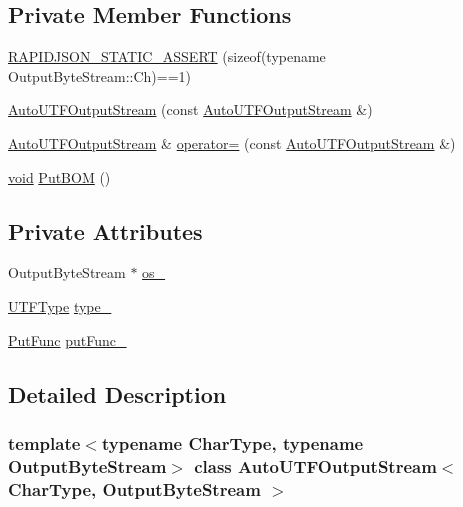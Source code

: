 \subsection*{Private Member Functions}
\begin{DoxyCompactItemize}
\item 
\hyperlink{classAutoUTFOutputStream_a6fbc88c345f0b7beef9053e8a0315fb4}{R\+A\+P\+I\+D\+J\+S\+O\+N\+\_\+\+S\+T\+A\+T\+I\+C\+\_\+\+A\+S\+S\+E\+RT} (sizeof(typename Output\+Byte\+Stream\+::\+Ch)==1)
\item 
\hyperlink{classAutoUTFOutputStream_aceb5330e6fddef6a439a105fe501f1d4}{Auto\+U\+T\+F\+Output\+Stream} (const \hyperlink{classAutoUTFOutputStream}{Auto\+U\+T\+F\+Output\+Stream} \&)
\item 
\hyperlink{classAutoUTFOutputStream}{Auto\+U\+T\+F\+Output\+Stream} \& \hyperlink{classAutoUTFOutputStream_a498613c6dcada9980fea3d6094f21215}{operator=} (const \hyperlink{classAutoUTFOutputStream}{Auto\+U\+T\+F\+Output\+Stream} \&)
\item 
\hyperlink{imgui__impl__opengl3__loader_8h_ac668e7cffd9e2e9cfee428b9b2f34fa7}{void} \hyperlink{classAutoUTFOutputStream_abcfbaa81ceaddf06ae435ba3e78421d7}{Put\+B\+OM} ()
\end{DoxyCompactItemize}
\subsection*{Private Attributes}
\begin{DoxyCompactItemize}
\item 
Output\+Byte\+Stream $\ast$ \hyperlink{classAutoUTFOutputStream_a723efb60d9fdb46e6094db891d24a509}{os\+\_\+}
\item 
\hyperlink{encodings_8h_ac9448aedf514a5bb509bae73a9ce4e58}{U\+T\+F\+Type} \hyperlink{classAutoUTFOutputStream_a767a11d3801e410881972013376d69eb}{type\+\_\+}
\item 
\hyperlink{classAutoUTFOutputStream_a398450792738ee1cb865fc96dfde9e1a}{Put\+Func} \hyperlink{classAutoUTFOutputStream_af15ae56768d0f65b5938eab255493274}{put\+Func\+\_\+}
\end{DoxyCompactItemize}


\subsection{Detailed Description}
\subsubsection*{template$<$typename Char\+Type, typename Output\+Byte\+Stream$>$\newline
class Auto\+U\+T\+F\+Output\+Stream$<$ Char\+Type, Output\+Byte\+Stream $>$}

